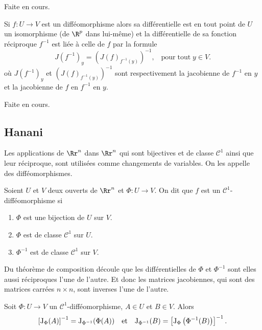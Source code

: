 \documentclass[12pt, class=report,crop=false]{standalone}
\begin{document}
 Faite en cours.


\begin{proposition}
 \textcolor[rgb]{0.44,0.00,0.87}{
  Si $f: U \rightarrow V$ est un diff\'eomorphisme alors sa diff\'erentielle est en tout point de
$U$ un isomorphisme (de $\R^p$ dans lui-même) et la diff\'erentielle de sa fonction r\'eciproque $f^{-1}$
est li\'ee \`a celle de $f$ par la formule
\begin{equation*}
  J(f^{-1})_y=(J(f)_{f^{-1}(y)})^{-1}, \;\;\mathrm{\; pour\; tout \;} y \in V.
\end{equation*}
où $ J(f^{-1})_y$ et $(J(f)_{f^{-1}(y)})^{-1}$ sont respectivement la jacobienne de $f^{-1}$ en $y$ et la jacobienne de 
$f$ en $f^{-1}$ en $y$.}
\end{proposition}

 Faite en cours.


\subsection{Hanani}

Les applications de $\Rr^n$ dans $\Rr^n$ qui sont bijectives et de classe $\mathscr{C}^1$ ainsi que leur réciproque, sont utilisées comme changements de variables. On les appelle des difféomorphismes.

\vskip6mm

\begin{definition}Soient $U$ et $V$ deux ouverts de $\Rr^n$ et $\Phi:U\to V$. On dit que $f$ est un ${\mathscr C}^1$-difféomorphisme si
\begin{enumerate}
\item $\Phi$ est une bijection de $U$ sur $V$.
\item $\Phi$ est de classe ${\mathscr C}^1$ sur $U$.
\item $\Phi^{-1}$ est de classe ${\mathscr C}^1$ sur $V$.
\end{enumerate}
\end{definition}

\vskip4mm

\noindent Du théorème de composition découle que les différentielles de $\Phi$ et $\Phi^{-1}$ sont elles aussi réciproques l'une de l'autre. Et donc les matrices jacobiennes, qui sont des matrices carrées $n\times n$, sont inverses l'une de l'autre.

\vskip6mm

\begin{proposition}Soit $\Phi:U\to V$ un ${\mathscr C}^1$-difféomorphisme, $A\in U$ et $B\in V$. Alors
$$\left[\mathrm{J} _{\Phi}(A)\right]^{-1}=\mathrm{J} _{\Phi ^{-1}}(\Phi(A))\quad \mbox{et}\quad \mathrm{J} _{\Phi ^{-1}}(B)=\left[\mathrm{J} _{\Phi}\left(\Phi^{-1}(B)\right)\right]^{-1}.$$
\end{proposition}
\end{document}
